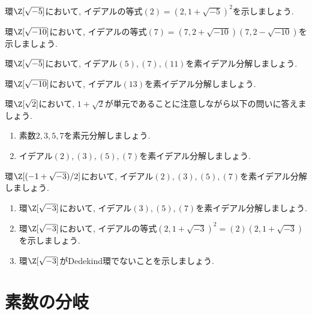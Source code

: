 \documentclass[11pt,b5paper,oneside,titlepage,lualatex]{ltjsreport}
\begin{document}
\begin{exc}{}{}
	環$ \Z[\sqrt{-5}] $において, イデアルの等式$ (2) = (2, 1 + \sqrt{-5})^2 $を示しましょう. 
\end{exc}

\begin{exc}{}{}
	環$ \Z[\sqrt{-10}] $において, イデアルの等式$ (7) = (7, 2 + \sqrt{-10}) (7, 2 - \sqrt{-10}) $を示しましょう. 
\end{exc}

\begin{exc}{}{}
	環$ \Z[\sqrt{-5}] $において, イデアル$ (5), (7), (11) $を素イデアル分解しましょう. 
\end{exc}

\begin{exc}{}{}
	環$ \Z[\sqrt{-10}] $において, イデアル$ (13) $を素イデアル分解しましょう. 
\end{exc}

\begin{exc}{}{}
	環$ \Z[\sqrt{2}] $において, $ 1 + \sqrt{2} $が単元であることに注意しながら以下の問いに答えましょう.
	\begin{enumerate}
		\item 素数$ 2, 3, 5, 7 $を素元分解しましょう. 
		\item イデアル$ (2), (3), (5), (7) $を素イデアル分解しましょう. 
	\end{enumerate}
\end{exc}

\begin{exc}{}{}
	環$ \Z[(-1 + \sqrt{-3})/2] $において, イデアル$ (2), (3), (5), (7) $を素イデアル分解しましょう. 
\end{exc}

\begin{exc}{}{}
	\begin{enumerate}
		\item 環$ \Z[\sqrt{-3}] $において, イデアル$ (3), (5), (7) $を素イデアル分解しましょう. 
		\item 環$ \Z[\sqrt{-3}] $において, イデアルの等式$ (2, 1+\sqrt{-3})^2 = (2)(2, 1+\sqrt{-3}) $を示しましょう. 
		\item 環$ \Z[\sqrt{-3}] $がDedekind環でないことを示しましょう.
	\end{enumerate}
\end{exc}


\section{素数の分岐} \label{sec:素数の分岐}
\end{document}
